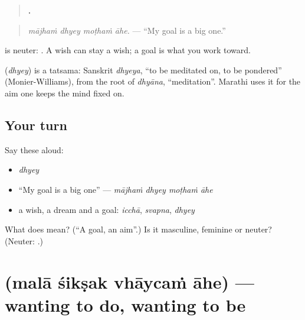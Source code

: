 \begin{quote}
\textbf{   .}
\end{quote}

\begin{quote}
\emph{mājhaṁ dhyey moṭhaṁ āhe.} — \textquotedblleft{}My goal is a big one.\textquotedblright{}
\end{quote}

\textbf{} is neuter: \textbf{ }. A wish can stay a wish; a goal is what you work toward.

\begin{cousinweb}
\textbf{} (\emph{dhyey}) is a tatsama: Sanskrit \emph{dhyeya}, \textquotedblleft{}to be meditated on, to be pondered\textquotedblright{} (Monier-Williams), from the root of \emph{dhyāna}, \textquotedblleft{}meditation\textquotedblright{}. Marathi uses it for the aim one keeps the mind fixed on.
\end{cousinweb}

\subsection*{Your turn}
Say these aloud:

\begin{itemize}
\raggedright
  \item \emph{dhyey}
  \item \textquotedblleft{}My goal is a big one\textquotedblright{} — \emph{mājhaṁ dhyey moṭhaṁ āhe}
  \item a wish, a dream and a goal: \emph{icchā}, \emph{svapna}, \emph{dhyey}
\end{itemize}

\begin{tcolorbox}[breakable,colback=teal!4,colframe=teal!35!black,title={Before you move on}]
What does \textbf{} mean? (\textquotedblleft{}A goal, an aim\textquotedblright{}.) Is it masculine, feminine or neuter? (Neuter: \textbf{ }.)
\end{tcolorbox}
\section[\texorpdfstring{\mr{मला} \mr{शिक्षक} \mr{व्हायचं} \mr{आहे} (malā śikṣak …)}{मला शिक्षक व्हायचं आहे (malā śikṣak …)}]{    (malā śikṣak vhāycaṁ āhe) — wanting to do, wanting to be}

\label{lesson:MR-C284-vhaycha-ahe}



